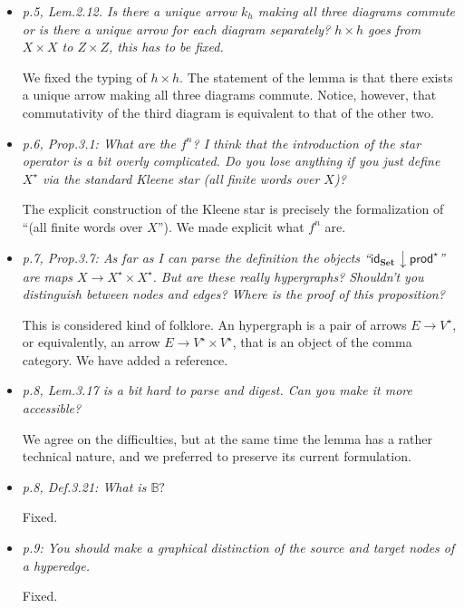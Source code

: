\documentclass[english,11pt,a4paper]{article}
\newcommand{\comma}[2]{#1\hspace{1pt} {\downarrow}#2}
\newcommand{\id}[1]{\mathsf{id}_{#1}}
\newcommand{\Set}{\mathbf{Set}}
\newcommand{\pro}{\mathsf{prod}}
\begin{document}
\begin{itemize}
	
	\item \emph {p.5, Lem.2.12. Is there a unique arrow $k_h$ making all three
		diagrams commute or is there a unique arrow for each diagram
		separately?
		$h\times h$ goes from $X\times X$ to $Z \times Z$, this has to be fixed.}
	
	We fixed the typing of $h \times h$. The statement of the lemma is that there exists a unique arrow making all three diagrams commute. Notice, however, that commutativity of the third diagram is equivalent to that of the other two.
	
	\item \emph{ p.6, Prop.3.1: What are the $f^n$?
		I think that the introduction of the star operator is a bit overly
		complicated. Do you lose anything if you just define $X^\star$
		via the standard Kleene star (all finite words over $X$)?}
	
	The explicit construction of the Kleene star is precisely the formalization of  ``(all finite words over $X$''). We made explicit what $f^n$ are.
	
	\item \emph{p.7, Prop.3.7: As far as I can parse the definition the 
		objects ``$\comma{\id{\Set}}{\pro^\star}$''  are maps $X\rightarrow X^\star \times X^\star$.
		But are these really hypergraphs? Shouldn't you distinguish
		between nodes and edges? Where is the proof of this proposition?}
	
	This is considered kind of folklore. An hypergraph is a pair of arrows $E \to V^\star$, or equivalently, an arrow $E \to V^\star \times V^\star$, that is an object of the comma category. We have added a reference.
	
	
	\item \emph{ p.8, Lem.3.17 is a bit hard to parse and digest. Can you make
		it more accessible?}
	
	We agree on the difficulties, but at the same time the lemma has a rather technical nature, and we preferred to preserve its current formulation. 
	
	\item \emph{ p.8, Def.3.21: What is $\mathbb{B}?$}
	
	Fixed.
	
	
	\item \emph{ p.9: You should make a graphical distinction of the source
		and target nodes of a hyperedge.}
	
	Fixed.
	

\end{itemize}
\end{document}
